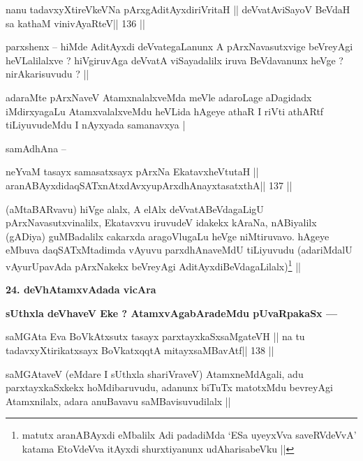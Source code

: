 \begin{shl}
nanu tadavxyXtireVkeVNa pArxgAditAyxdiriVritaH ||
deVvatAviSayoV BeVdaH sa kathaM vinivAyaRteV\hfill || 136 ||
\end{shl}

\begin{artha}
parxshenx -- hiMde AditAyxdi deVvategaLanunx A pArxNavasutxvige beVreyAgi heVLalilalxve ? hiVgiruvAga deVvatA viSayadalilx iruva BeVdavanunx heVge ? nirAkarisuvudu ? ||
\end{artha}

\begin{artha}
adaraMte pArxNaveV AtamxnalalxveMda meVle adaroLage aDagidadx iMdirxyagaLu AtamxvalalxveMdu heVLida hAgeye athaR I riVti athARtf tiLiyuvudeMdu I nAyxyada samanavxya |
\end{artha}

\begin{artha}
samAdhAna --
\end{artha}

\begin{shl}
neYvaM tasayx samasatxsayx pArxNa EkatavxheVtutaH ||
aranABAyxdidaqSATxnAtxdAvxyupArxdhAnayxtasatxthA\hfill || 137 ||
\end{shl}

\begin{artha}
(aMtaBARvavu) hiVge alalx, A elAlx deVvatABeVdagaLigU pArxNavasutxvinalilx, Ekatavxvu iruvudeV idakekx kAraNa, nABiyalilx (gADiya) guMBadalilx cakarxda aragoVlugaLu heVge niMtiruvavo. hAgeye eMbuva daqSATxMtadimda vAyuvu parxdhAnaveMdU tiLiyuvudu (adariMdalU vAyurUpavAda pArxNakekx beVreyAgi AditAyxdiBeVdagaLilalx)\footnote{matutx aranABAyxdi eMbalilx Adi padadiMda `ESa uyeyxVva saveRVdeVvA'
 katama EtoVdeVva itAyxdi shurxtiyanunx udAharisabeVku ||} ||
\end{artha}

\begin{artha}
{\bf 24. deVhAtamxvAdada vicAra}

{\bf sUthxla deVhaveV Eke ? AtamxvAgabAradeMdu pUvaRpakaSx ---}
\end{artha}

\begin{shl}
saMGAta Eva BoVkAtx\s sutx tasayx parxtayxkaSxsaMgateVH ||
na tu tadavxyXtirikatxsayx BoVkatxqqtA mitayxsaMBavAtf\hfill || 138 ||
\end{shl}

\begin{artha}
saMGAtaveV (eMdare I sUthxla shariVraveV) AtamxneMdAgali, adu parxtayxkaSxkekx hoMdibaruvudu, adanunx biTuTx matotxMdu bevreyAgi Atamxnilalx, adara anuBavavu saMBavisuvudilalx ||
\end{artha}

